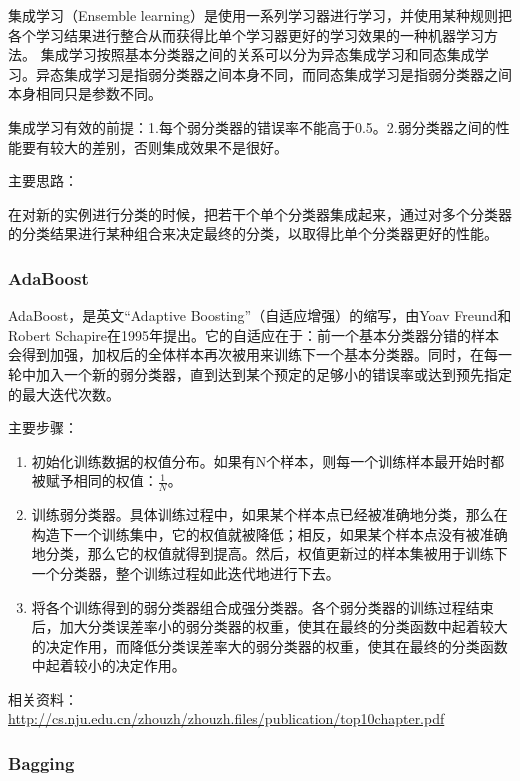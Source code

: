 \documentclass[12pt]{article}
\begin{document}
集成学习（Ensemble learning）是使用一系列学习器进行学习，并使用某种规则把各个学习结果进行整合从而获得比单个学习器更好的学习效果的一种机器学习方法。
集成学习按照基本分类器之间的关系可以分为{\color{blue}异态集成学习}和{\color{blue}同态集成学习}。异态集成学习是指弱分类器之间本身不同，而同态集成学习是指弱分类器之间本身相同只是参数不同。

集成学习有效的前提：1.每个弱分类器的错误率不能高于0.5。2.弱分类器之间的性能要有较大的差别，否则集成效果不是很好。

{\color{blue}主要思路}：

在对新的实例进行分类的时候，把若干个单个分类器集成起来，通过对多个分类器的分类结果进行某种组合来决定最终的分类，以取得比单个分类器更好的性能。

\subsubsection{AdaBoost}

AdaBoost，是英文``Adaptive Boosting''（自适应增强）的缩写，由Yoav Freund和Robert Schapire在1995年提出。它的自适应在于：前一个基本分类器分错的样本会得到加强，加权后的全体样本再次被用来训练下一个基本分类器。同时，在每一轮中加入一个新的弱分类器，直到达到某个预定的足够小的错误率或达到预先指定的最大迭代次数。

{\color{blue}主要步骤}：
\begin{enumerate}
    \item 初始化训练数据的权值分布。如果有N个样本，则每一个训练样本最开始时都被赋予相同的权值：$\frac{1}{N}$。
    \item 训练弱分类器。具体训练过程中，如果某个样本点已经被准确地分类，那么在构造下一个训练集中，它的权值就被降低；相反，如果某个样本点没有被准确地分类，那么它的权值就得到提高。然后，权值更新过的样本集被用于训练下一个分类器，整个训练过程如此迭代地进行下去。
    \item 将各个训练得到的弱分类器组合成强分类器。各个弱分类器的训练过程结束后，加大分类误差率小的弱分类器的权重，使其在最终的分类函数中起着较大的决定作用，而降低分类误差率大的弱分类器的权重，使其在最终的分类函数中起着较小的决定作用。
\end{enumerate}

相关资料：\url{http://cs.nju.edu.cn/zhouzh/zhouzh.files/publication/top10chapter.pdf}

\subsubsection{Bagging}
\end{document}
